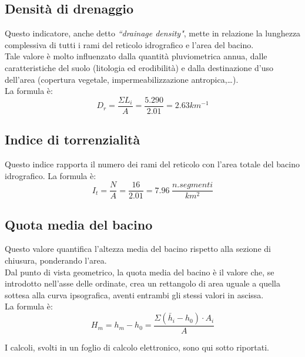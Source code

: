 \subsection{Densità di drenaggio}
Questo indicatore, anche detto \textit{``drainage density"}, mette in relazione la lunghezza complessiva di tutti i rami del reticolo idrografico e l'area del bacino.\\
Tale valore è molto influenzato dalla quantità pluviometrica annua, dalle caratteristiche del suolo (litologia ed erodibilità) e dalla destinazione d'uso dell'area (copertura vegetale, impermeabilizzazione antropica,\dots).\\
La formula è:
\begin{equation}
    D_r = \frac{\Sigma L_i}{A} = \frac{5.290}{2.01} = 2.63 km^{-1}
    \label{drenaggio}
\end{equation}

\subsection{Indice di torrenzialità}
Questo indice rapporta il numero dei rami del reticolo con l'area totale del bacino idrografico.
La formula è:
\begin{equation}
I_t = \frac{N}{A} = \frac{16}{2.01} = 7.96 \hspace{3pt}\frac{n. segmenti}{km^2} 
\label{torrenzialità}
\end{equation}

\subsection{Quota media del bacino}
Questo valore quantifica l'altezza media del bacino rispetto alla sezione di chiusura, ponderando l'area.\\
Dal punto di vista geometrico, la quota media del bacino è il valore che, se introdotto nell'asse delle ordinate, crea un rettangolo di area uguale a quella sottesa alla curva ipsografica, aventi entrambi gli stessi valori in ascissa.\\
La formula è:
\begin{equation}
    H_m = h_m - h_0 = \frac{\Sigma (\bar{h}_i - h_0) \cdot A_i}{A}
    \label{quota_media}
\end{equation}

\noindent I calcoli, svolti in un foglio di calcolo elettronico, sono qui sotto riportati.

